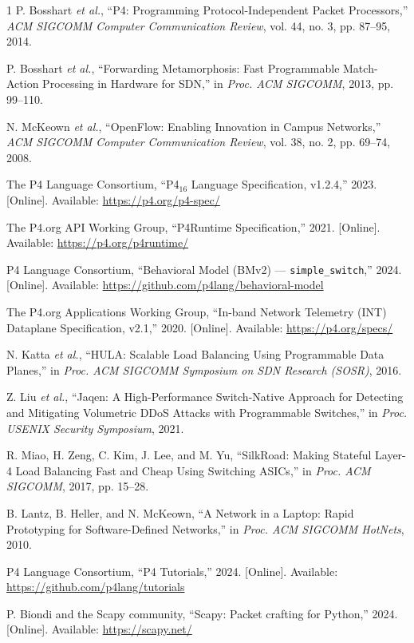 \documentclass[conference,onecolumn,10pt]{IEEEtran}
\begin{document}
\begin{thebibliography}{1}
\small
{}
P. Bosshart \emph{et al.}, ``P4: Programming Protocol-Independent Packet
Processors,'' \emph{ACM SIGCOMM Computer Communication Review}, vol. 44, no. 3,
pp. 87--95, 2014.

P. Bosshart \emph{et al.}, ``Forwarding Metamorphosis: Fast Programmable
Match-Action Processing in Hardware for SDN,'' in \emph{Proc. ACM SIGCOMM}, 2013,
pp. 99--110.

N. McKeown \emph{et al.}, ``OpenFlow: Enabling Innovation in Campus Networks,''
\emph{ACM SIGCOMM Computer Communication Review}, vol. 38, no. 2, pp. 69--74,
2008.

The P4 Language Consortium, ``P4$_{16}$ Language Specification, v1.2.4,'' 2023.
[Online]. Available: \url{https://p4.org/p4-spec/}

The P4.org API Working Group, ``P4Runtime Specification,'' 2021. [Online].
Available: \url{https://p4.org/p4runtime/}

P4 Language Consortium, ``Behavioral Model (BMv2) --- \texttt{simple\_switch},''
2024. [Online]. Available: \url{https://github.com/p4lang/behavioral-model}

The P4.org Applications Working Group, ``In-band Network Telemetry (INT) Dataplane
Specification, v2.1,'' 2020. [Online]. Available:
\url{https://p4.org/specs/}

N. Katta \emph{et al.}, ``HULA: Scalable Load Balancing Using Programmable Data
Planes,'' in \emph{Proc. ACM SIGCOMM Symposium on SDN Research (SOSR)}, 2016.

Z. Liu \emph{et al.}, ``Jaqen: A High-Performance Switch-Native Approach for
Detecting and Mitigating Volumetric DDoS Attacks with Programmable Switches,'' in
\emph{Proc. USENIX Security Symposium}, 2021.

R. Miao, H. Zeng, C. Kim, J. Lee, and M. Yu, ``SilkRoad: Making Stateful Layer-4
Load Balancing Fast and Cheap Using Switching ASICs,'' in \emph{Proc. ACM
SIGCOMM}, 2017, pp. 15--28.

B. Lantz, B. Heller, and N. McKeown, ``A Network in a Laptop: Rapid Prototyping
for Software-Defined Networks,'' in \emph{Proc. ACM SIGCOMM HotNets}, 2010.

P4 Language Consortium, ``P4 Tutorials,'' 2024. [Online]. Available:
\url{https://github.com/p4lang/tutorials}

P. Biondi and the Scapy community, ``Scapy: Packet crafting for Python,'' 2024.
[Online]. Available: \url{https://scapy.net/}
\end{thebibliography}
\end{document}
